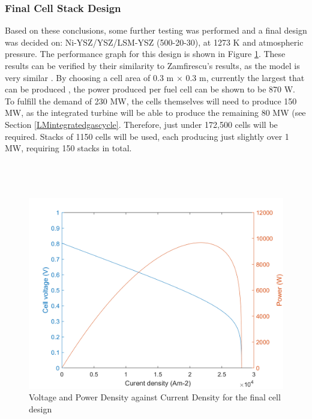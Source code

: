\documentclass{article}
\begin{document}
    \subsubsection{Final Cell Stack Design}
    
    Based on these conclusions, some further testing was performed and a final design was decided on:
Ni-YSZ/YSZ/LSM-YSZ (500-20-30), at 1273 K and atmospheric pressure. The performance graph for this design is shown in Figure \ref{LMfig:SOFCfinal}. These results can be verified by their similarity to Zamfirescu's results, as the model is very similar \cite{LM5}. By choosing a cell area of 0.3 m $\times$ 0.3 m, currently the largest that can be produced \cite{LM10}, the power produced per fuel cell can be shown to be 870 W. To fulfill the demand of 230 MW, the cells themselves will need to produce 150 MW, as the integrated turbine will be able to produce the remaining 80 MW (see Section \ref{LMintegratedgascycle}. Therefore, just under 172,500 cells will be required. Stacks of 1150 cells will be used, each producing just slightly over 1 MW, requiring 150 stacks in total.
\\
\\
\\
\\

\begin{figure}[h]
    \centering
    \includegraphics[scale = 0.25]{power_voltage_against_current.png}
    \caption{Voltage and Power Density against Current Density for the final cell design}
    \label{LMfig:SOFCfinal}
\end{figure}
\end{document}
